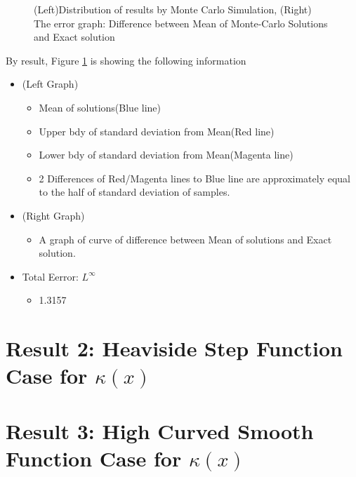 \documentclass[11pt,letterpaper]{article}
\begin{document}
\clearpage

\begin{figure}[h]
\begin{center}
\caption{\label{MeanVarCrv} (Left)Distribution of results by Monte Carlo Simulation, (Right) The error graph: Difference between Mean of Monte-Carlo Solutions and Exact solution}
\end{center}
\end{figure}

By result, Figure \ref{MeanVarCrv} is showing the following information
\begin{itemize}
\item (Left Graph) 
	\begin{itemize}
	\item Mean of solutions(Blue line)
	\item Upper bdy of standard deviation from Mean(Red line)
	\item Lower bdy of standard deviation from Mean(Magenta line)
	\item 2 Differences of Red/Magenta lines to Blue line are approximately equal to the half of standard deviation of samples.
	\end{itemize}	

\item (Right Graph)
	\begin{itemize}
        \item A graph of curve of difference between Mean of solutions and Exact solution.
	\end{itemize}
\item Total Eerror: $L^{\infty}$
	\begin{itemize}
        \item 1.3157
	\end{itemize}
\end{itemize}

\section {Result 2: Heaviside Step Function Case for $\kappa(x)$}

\section {Result 3: High Curved Smooth Function Case for $\kappa(x)$}
\end{document}

